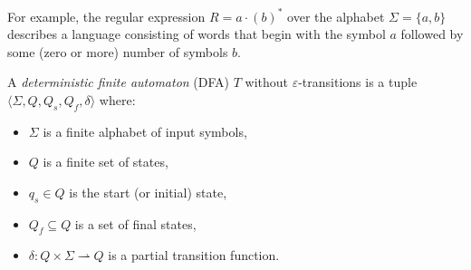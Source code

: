 For example, the regular expression $R = a \cdot (b)^*$ over the alphabet $\Sigma = \{a, b\}$ describes a language consisting of words that begin with the symbol $a$ followed by some (zero or more) number of symbols $b$.

\begin{definition}
A \textit{deterministic finite automaton} (DFA) $T$ without $\varepsilon$-transitions is a tuple $\langle \Sigma, Q, Q_s, Q_f, \delta \rangle$ where:
\begin{itemize}
    \item $\Sigma$ is a finite alphabet of input symbols,
    \item $Q$ is a finite set of states,
    \item $q_s \in Q$ is the start (or initial) state,
    \item $Q_f \subseteq Q$ is a set of final states,
    \item $\delta: Q \times \Sigma \rightharpoonup Q$ is a partial transition function.
\end{itemize}
\end{definition}

